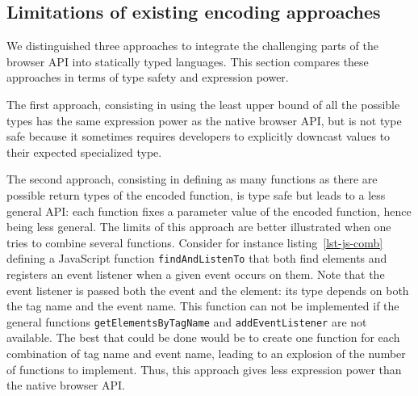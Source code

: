 \documentclass{llncs}
\newcommand{\jscode}[1]{\lstinline[language=JavaScript]|#1|}
\begin{document}
% 

\subsection{Limitations of existing encoding approaches}
\label{sec-limitations}

We distinguished three approaches to integrate the challenging parts of the browser API into statically typed languages. This section compares these approaches in terms of type safety and expression power.

The first approach, consisting in using the least upper bound of all the possible types has the same expression power as the native browser API, but is not type safe because it sometimes requires developers to explicitly downcast values to their expected specialized type.

The second approach, consisting in defining as many functions as there are possible return types of the encoded function, is type safe but leads to a less general API: each function fixes a parameter value of the encoded function, hence being less general. The limits of this approach are better illustrated when one tries to combine several functions. Consider for instance listing~\ref{lst-js-comb} defining a JavaScript function \jscode{findAndListenTo} that both find elements and registers an event listener when a given event occurs on them. Note that the event listener is passed both the event and the element: its type depends on both the tag name and the event name. This function can not be implemented if the general functions \jscode{getElementsByTagName} and \jscode{addEventListener} are not available. The best that could be done would be to create one function for each combination of tag name and event name, leading to an explosion of the number of functions to implement. Thus, this approach gives less expression power than the native browser API.
\end{document}
